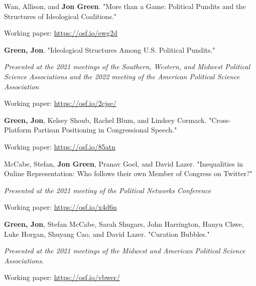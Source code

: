 \documentclass[letterpaper]{article}
\renewenvironment{itemize}{
  \begin{list}{}{
    \setlength{\leftmargin}{1.5em}
  }
}{
  \end{list}
}
\begin{document}
\begin{itemize}
\item Wan, Allison, and \textbf{Jon Green}. "More than a Game: Political Pundits and the Structures of Ideological Coalitions." 
\begin{itemize}
\item Working paper: \url{https://osf.io/ewg2d}
\end{itemize}

\item \textbf{Green, Jon}. "Ideological Structures Among U.S. Political Pundits." 
\begin{itemize}
\item \textit{Presented at the 2021 meetings of the Southern, Western, and Midwest Political Science Associations and the 2022 meeting of the American Political Science Association}
\item Working paper: \url{https://osf.io/2cjse/}
\end{itemize}

\item \textbf{Green, Jon}, Kelsey Shoub, Rachel Blum, and Lindsey Cormack. "Cross-Platform Partisan Positioning in Congressional Speech."
\begin{itemize}
\item Working paper: \url{https://osf.io/85atn}
\end{itemize}

\item McCabe, Stefan, \textbf{Jon Green}, Pranav Goel, and David Lazer. "Inequalities in Online Representation: Who follows their own Member of Congress on Twitter?"
\begin{itemize}
\item \textit{Presented at the 2021 meeting of the Political Networks Conference}
\item Working paper: \url{https://osf.io/x4d6n}
\end{itemize} 

\item \textbf{Green, Jon}, Stefan McCabe, Sarah Shugars, John Harrington, Hanyu Chwe, Luke Horgan, Shuyang Cao, and David Lazer.  "Curation Bubbles."
\begin{itemize}
\item \textit{Presented at the 2021 meetings of the Midwest and American Political Science Associations}.
\item Working paper: \url{https://osf.io/vbwer/}
\end{itemize} 


\end{itemize}
\end{document}
